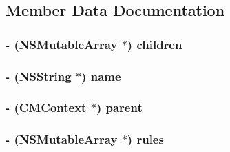 \subsection{Member Data Documentation}
\hypertarget{interface_c_m_context_0f56af66d0edbc10d1ab24342416b8f0}{
\subsubsection[children]{\setlength{\rightskip}{0pt plus 5cm}- (NSMutableArray $\ast$) {\bf children}}}
\label{interface_c_m_context_0f56af66d0edbc10d1ab24342416b8f0}


\hypertarget{interface_c_m_context_46c82635439f9fa7e72ea26658c75e9b}{
\subsubsection[name]{\setlength{\rightskip}{0pt plus 5cm}- ({\bf NSString} $\ast$) {\bf name}}}
\label{interface_c_m_context_46c82635439f9fa7e72ea26658c75e9b}


\hypertarget{interface_c_m_context_c34d30931a639b237c9249b65641180a}{
\subsubsection[parent]{\setlength{\rightskip}{0pt plus 5cm}- ({\bf CMContext} $\ast$) {\bf parent}}}
\label{interface_c_m_context_c34d30931a639b237c9249b65641180a}


\hypertarget{interface_c_m_context_9ce88fc0f29f5c91c2b88343332d179c}{
\subsubsection[rules]{\setlength{\rightskip}{0pt plus 5cm}- (NSMutableArray $\ast$) {\bf rules}}}
\label{interface_c_m_context_9ce88fc0f29f5c91c2b88343332d179c}


